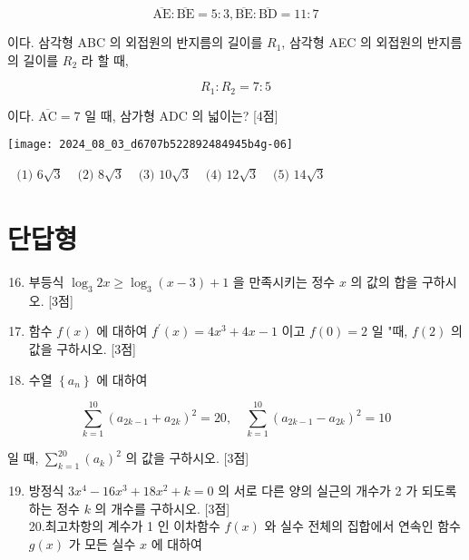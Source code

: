 \documentclass[10pt]{article}
\begin{document}
\[
\overline{\mathrm{AE}}: \overline{\mathrm{BE}}=5: 3, \overline{\mathrm{BE}}: \overline{\mathrm{BD}}=11: 7
\]

이다. 삼각형 ABC 의 외접원의 반지름의 길이를 \(R_{1}\), 삼각형 AEC 의 외접원의 반지름의 길이를 \(R_{2}\) 라 할 때,

\[
R_{1}: R_{2}=7: 5
\]

이다. \(\overline{\mathrm{AC}}=7\) 일 때, 삼가형 ADC 의 넓이는? [4점]

\begin{center}
\texttt{[image: 2024\_08\_03\_d6707b522892484945b4g-06]}
\end{center}

\(\begin{array}{lllll}\text { (1) } 6 \sqrt{3} & \text { (2) } 8 \sqrt{3} & \text { (3) } 10 \sqrt{3} & \text { (4) } 12 \sqrt{3} & \text { (5) } 14 \sqrt{3}\end{array}\)

\section*{단답형}
\begin{enumerate}
  \setcounter{enumi}{15}
  \item 부등식 \(\log _{3} 2 x \geq \log _{3}(x-3)+1\) 을 만족시키는 정수 \(x\) 의 값의 합을 구하시오. [3점]

  \item 함수 \(f(x)\) 에 대하여 \(f^{\prime}(x)=4 x^{3}+4 x-1\) 이고 \(f(0)=2\) 일 "때, \(f(2)\) 의 값을 구하시오. [3점]

  \item 수열 \(\left\{a_{n}\right\}\) 에 대하여

\end{enumerate}

\[
\sum_{k=1}^{10}\left(a_{2 k-1}+a_{2 k}\right)^{2}=20, \quad \sum_{k=1}^{10}\left(a_{2 k-1}-a_{2 k}\right)^{2}=10
\]

일 때, \(\sum_{k=1}^{20}\left(a_{k}\right)^{2}\) 의 값을 구하시오. [3점]

\begin{enumerate}
  \setcounter{enumi}{18}
  \item 방정식 \(3 x^{4}-16 x^{3}+18 x^{2}+k=0\) 의 서로 다른 양의 실근의 개수가 2 가 되도록 하는 정수 \(k\) 의 개수를 구하시오. [3점]\\
20.최고차항의 계수가 1 인 이차함수 \(f(x)\) 와 실수 전체의 집합에서 연속인 함수 \(g(x)\) 가 모든 실수 \(x\) 에 대하여
\end{enumerate}
\end{document}
